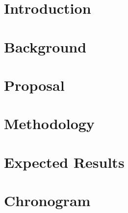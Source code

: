\documentclass[mestrado]{pacotes/unb-cic}
\begin{document}
\begin{abstract}


\end{abstract}

\tableofcontents
\listoffigures

\textual

\chapter{Introduction}

%
%



\chapter{Background}

%
%
%





%


\chapter{Proposal}




\chapter{Methodology}

\chapter{Expected Results}

\chapter{Chronogram}


\postextual
\anexos




\end{document}
